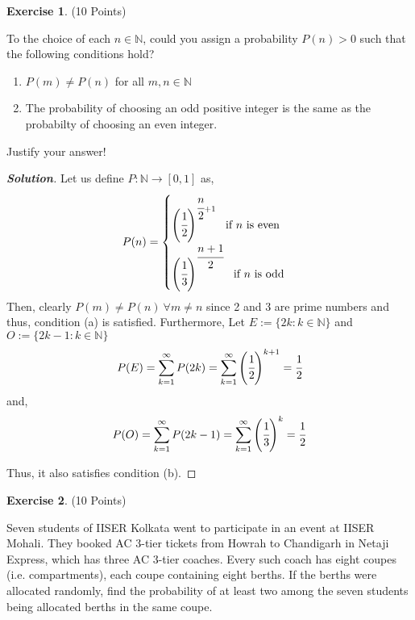 \documentclass[10pt]{scrartcl}
\theoremstyle{definition}
\newtheorem{exercise}{Exercise}
\newenvironment{solution} {\begin{proof}[\normalfont \textbf{Solution}]} {\end{proof}}
\newcommand{\nn}{\mathbb{N}}
\begin{document}
\begin{exercise}(10 Points)

    To the choice of each $n \in \nn$, could you assign a probability $P(n) > 0$ such that the following conditions hold?
    \begin{enumerate}[label={(\alph*)}]
        \item $P(m) \neq P(n)$ for all $m, n \in \nn$
        \item The probability of choosing an odd positive integer is the same as the probabilty of choosing an even integer.
    \end{enumerate}
    Justify your answer!
\end{exercise}
\begin{solution}
    Let us define $P: \nn \to [0, 1]$ as,
    $$
    P(n) = 
    \begin{cases}
        \left(\cfrac{1}{2}\right)^{\cfrac{n}{2} + 1} ~ \text{ if } n \text{ is even} \\ 
        \left(\cfrac{1}{3}\right)^{\cfrac{n + 1}{2}} ~ \text{ if } n \text{ is odd}
    \end{cases}
    $$
    Then, clearly $P(m) \neq P(n) ~ \forall m \neq n$ since 2 and 3 are prime numbers and thus, condition (a) is satisfied.
    Furthermore, Let $E := \{2k : k \in \nn\}$ and $O := \{2k - 1 : k \in \nn \}$
    $$P(E) = \sum_{k = 1}^{\infty} P(2k) = \sum_{k = 1}^{\infty} \left(\cfrac{1}{2}\right)^{k + 1} = \cfrac{1}{2}$$
    and, 
    $$P(O) = \sum_{k = 1}^{\infty} P(2k - 1) = \sum_{k = 1}^{\infty} \left(\cfrac{1}{3}\right)^{k} = \cfrac{1}{2}$$

    Thus, it also satisfies condition (b).
\end{solution}
\begin{exercise}(10 Points)

    Seven students of IISER Kolkata went to participate in an event at IISER Mohali. They booked
    AC 3-tier tickets from Howrah to Chandigarh in Netaji Express, which has three AC 3-tier
    coaches. Every such coach has eight coupes (i.e. compartments), each coupe containing eight
    berths. If the berths were allocated randomly, find the probability of at least two among the
    seven students being allocated berths in the same coupe.
\end{exercise}
\end{document}
